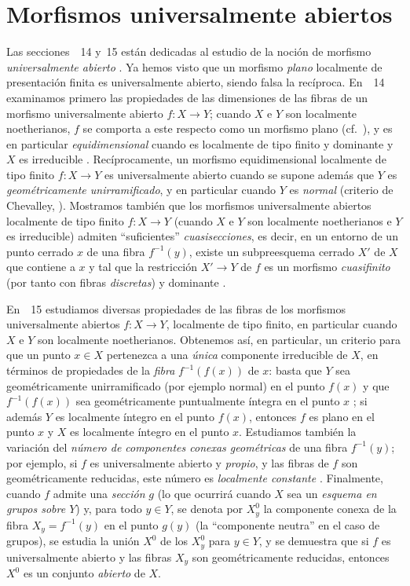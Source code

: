 \section{Morfismos universalmente abiertos}
\label{section:IV.14}

Las secciones~\textsection\textsection~14 y~15 están dedicadas al estudio de la noción de morfismo \emph{universalmente abierto} .
Ya hemos visto  que un morfismo \emph{plano} localmente de presentación finita es universalmente abierto, siendo falsa la recíproca.
En~\textsection~14 examinamos primero las propiedades de las dimensiones de las fibras de un morfismo universalmente abierto $f:X\to Y$; cuando $X$ e $Y$ son localmente noetherianos, $f$ se comporta a este respecto  como un morfismo plano (cf.~), y es en particular \emph{equidimensional} cuando es localmente de tipo finito y dominante y $X$ es irreducible .
Recíprocamente, un morfismo equidimensional localmente de tipo finito $f:X\to Y$ es universalmente abierto cuando se supone además que $Y$ es \emph{geométricamente unirramificado}, y en particular cuando $Y$ es \emph{normal} (criterio de Chevalley, ).
Mostramos también que los morfismos universalmente abiertos localmente de tipo finito $f:X\to Y$ (cuando $X$ e $Y$ son
localmente noetherianos e $Y$ es irreducible) admiten ``suficientes'' \emph{cuasisecciones}, es decir, en un entorno de un punto cerrado $x$ de una fibra $f^{-1}(y)$, existe un subpreesquema cerrado $X'$ de $X$ que contiene a $x$ y tal que la restricción $X'\to Y$ de $f$ es un morfismo \emph{cuasifinito} (por tanto con fibras \emph{discretas}) y dominante .

En~\textsection~15 estudiamos diversas propiedades de las fibras de los morfismos universalmente abiertos $f:X\to Y$, localmente de tipo finito, en particular cuando $X$ e $Y$ son localmente noetherianos.
Obtenemos así, en particular, un criterio para que un punto $x\in X$ pertenezca a una \emph{única} componente irreducible de $X$, en términos de propiedades de la \emph{fibra} $f^{-1}(f(x))$ de $x$: basta que $Y$ sea geométricamente unirramificado (por ejemplo normal) en el punto $f(x)$ y que $f^{-1}(f(x))$ sea geométricamente puntualmente íntegra en el punto $x$ ; si además $Y$ es localmente íntegro en el punto $f(x)$, entonces $f$ es plano en el punto $x$ y $X$ es localmente íntegro en el punto $x$.
Estudiamos también la variación del \emph{número de componentes conexas geométricas} de una fibra $f^{-1}(y)$; por ejemplo, si $f$ es universalmente abierto y \emph{propio}, y las fibras de $f$ son geométricamente reducidas, este número es \emph{localmente constante} .
Finalmente, cuando $f$ admite una \emph{sección} $g$ (lo que ocurrirá cuando $X$ sea un \emph{esquema en grupos sobre $Y$}) y, para todo $y\in Y$, se denota por $X_y^0$ la componente conexa de la fibra $X_y=f^{-1}(y)$ en el punto $g(y)$ (la ``componente neutra'' en el caso de grupos), se estudia la unión $X^0$ de los $X_y^0$ para $y\in Y$, y se demuestra  que si $f$ es universalmente abierto y las fibras $X_y$ son geométricamente reducidas, entonces $X^0$ es un conjunto \emph{abierto} de $X$.

